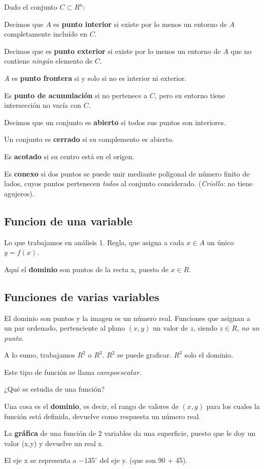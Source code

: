 Dado el conjunto \(C \subset R^{n}\):

Decimos que \(A\) es \textbf{punto interior} si existe por lo menos un entorno de \(A\)
completamente incluído en \(C\).

Decimos que es \textbf{punto exterior} si existe por lo menos un entorno de \(A\)
que no contiene \textit{ningún} elemento de \(C\).

\(A\) es \textbf{punto frontera} si y solo si no es interior ni exterior.

Es \textbf{punto de acumulación} si no pertenece a \(C\),
pero su entorno tiene intersección no vacía con \(C\).

Decimos que un conjunto es \textbf{abierto} si todos sus puntos son interiores.

Un conjunto es \textbf{cerrado} si su complemento es abierto.

Es \textbf{acotado} si su centro está en el origen.

Es \textbf{conexo} si dos puntos se puede unir
mediante poligonal
de número finito de lados,
cuyos puntos pertenecen \textit{todos}
al conjunto considerado.
(\textit{Criollo:} no tiene agujeros).

\subsection{Funcion de una variable}

Lo que trabajamos en análisis 1.
Regla, 
que asigna a cada \(x \in A\) un único \(y = f(x)\).

Aquí el \textbf{dominio} son puntos de la recta x,
puesto de \(x \in R\).

\subsection{Funciones de varias variables}

El dominio son puntos y la imagen es un número real.
Funciones que asignan a un par ordenado,
pertenciente al plano \((x,y)\) un valor de \(z\),
siendo \(z \in R\), \textit{no un punto}.

A lo sumo, trabajamos \(R^{2}\) o \(R^{3}\).
\(R^{2}\) se puede graficar.
\(R^{3}\) solo el dominio.

Este tipo de función se llama \(campo escalar\).

¿Qué se estudia de una función?

Una cosa es el \textbf{dominio},
es decir, 
el rango de valores de \((x,y)\) para los cuales la función está definida,
devuelve como respuesta un número real.

La \textbf{gráfica} de una función de 2 variables
da una superficie,
puesto que le doy un valor (x,y) y devuelve un real z.

El eje x se representa a \(-135^{\circ}\) del eje y.
(que son 90 + 45).

